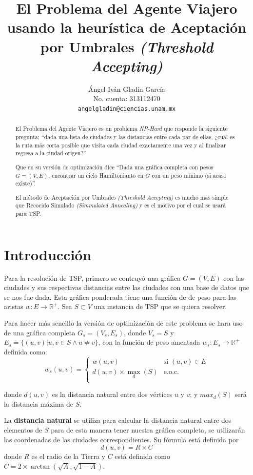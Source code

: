 \documentclass{article}
\title{El Problema del Agente Viajero usando la heurística de Aceptación por
Umbrales \emph{(Threshold Accepting)}}
\author{
  Ángel Iván Gladín García\\
  No. cuenta: 313112470\\
  \texttt{angelgladin@ciencias.unam.mx} \\
}
\begin{document}
\maketitle

\begin{abstract}
El Problema del Agente Viajero es un problema \emph{NP-Hard} que responde la siguiente pregunta;
``dada una lista de ciudades y las distancias entre cada par de ellas, ¿cuál es la ruta más corta
posible que visita cada ciudad exactamente una vez y al finalizar regresa a la ciudad origen?''

Que en su versión de optimización dice ``Dada una gráfica completa con pesos $G=(V,E)$, encontrar un ciclo
Hamiltonianto en $G$ con un peso mínimo (si acaso existe)''.

El método de Aceptación por Umbrales \emph{(Threshold Accepting)} es mucho más simple que Recocido
Simulado \emph{(Simmulated Annealing)} y es el motivo por el cual se usará para TSP.
\end{abstract}


\section{Introducción}
Para la resolución de TSP, primero se contruyó una gráfica $G=(V,E)$ con las ciudades y sus respectivas
distancias entre las ciudades con una base de datos que se nos fue dada. Esta gráfica ponderada
tiene una función de de peso para las aristas $w: E \to \mathds{R}^+$. Sea $S \subset V$ una
instancia de TSP que se quiera resolver.

Para hacer más sencillo la versión de optimización de este problema se hara uso de una
gráfica completa $G_s =(V_s, E_s)$, donde $V_s = S$ y $E_s= \{ (u,v) | u,v \in S \land u \not= v \}$,
con la función de peso amentada $w_s : E_s \to \mathds{R}^+$ definida como:
\[
  w_s(u,v) =
    \begin{cases}
      w(u,v)                   & \text{si }(u,v) \in E\\
      d(u,v) \times \max_d (S) &\text{e.o.c.}\\
    \end{cases}
\]

donde $d(u,v)$ es la distancia natural entre dos vértices $u$ y $v$; y $max_d (S)$ será la
distancia máxima de $S$.

La \textbf{distancia natural} se utiliza para calcular la distancia natural entre dos elementos
de $S$ para de esta manera tener nuestra gráfica completa, se utilizarán las coordenadas de las
ciudades correspondientes. Su fórmula está definida por
\[
    d(u,v) = R \times C
\]
donde $R$ es el radio de la Tierra y $C$ está definida como $C = 2 \times \arctan(\sqrt{A},\sqrt{1-A})$.
\end{document}

